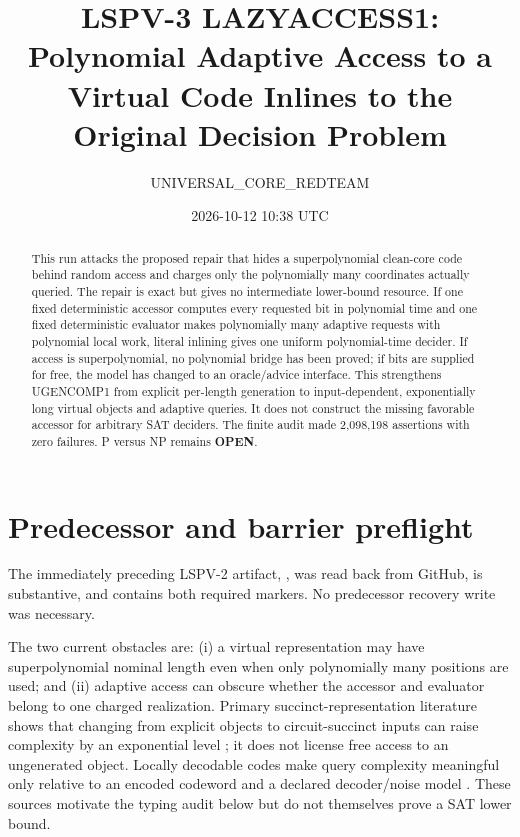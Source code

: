 \documentclass[11pt]{article}
\title{LSPV-3 LAZYACCESS1: Polynomial Adaptive Access to a Virtual Code Inlines to the Original Decision Problem}
\author{UNIVERSAL\_CORE\_REDTEAM}
\date{2026-10-12 10:38 UTC}
\newcommand{\OPEN}{\textbf{OPEN}}
\begin{document}
\maketitle

\begin{abstract}
This run attacks the proposed repair that hides a superpolynomial clean-core
code behind random access and charges only the polynomially many coordinates
actually queried.  The repair is exact but gives no intermediate lower-bound
resource.  If one fixed deterministic accessor computes every requested bit
in polynomial time and one fixed deterministic evaluator makes polynomially
many adaptive requests with polynomial local work, literal inlining gives one
uniform polynomial-time decider.  If access is superpolynomial, no polynomial
bridge has been proved; if bits are supplied for free, the model has changed
to an oracle/advice interface.  This strengthens UGENCOMP1 from explicit
per-length generation to input-dependent, exponentially long virtual objects
and adaptive queries.  It does not construct the missing favorable accessor
for arbitrary SAT deciders.  The finite audit made 2,098,198 assertions with
zero failures.  P versus NP remains \OPEN.
\end{abstract}

\section{Predecessor and barrier preflight}
The immediately preceding LSPV-2 artifact,
,
was read back from GitHub, is substantive, and contains both required
markers.  No predecessor recovery write was necessary.

The two current obstacles are: (i) a virtual representation may have
superpolynomial nominal length even when only polynomially many positions are
used; and (ii) adaptive access can obscure whether the accessor and evaluator
belong to one charged realization.  Primary succinct-representation
literature shows that changing from explicit objects to circuit-succinct
inputs can raise complexity by an exponential level \cite{GW83,PY86}; it does
not license free access to an ungenerated object.  Locally decodable codes
make query complexity meaningful only relative to an encoded codeword and a
declared decoder/noise model \cite{Yekhanin11}.  These sources motivate the
typing audit below but do not themselves prove a SAT lower bound.
\end{document}
